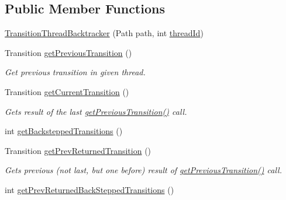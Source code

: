 \subsection*{Public Member Functions}
\begin{DoxyCompactItemize}
\item 
\hyperlink{classgov_1_1nasa_1_1jpf_1_1inspector_1_1server_1_1pathanalysis_1_1_transition_thread_backtracker_a4ebb7b90ea61c6e40ed85ec25c33537e}{Transition\+Thread\+Backtracker} (Path path, int \hyperlink{classgov_1_1nasa_1_1jpf_1_1inspector_1_1server_1_1pathanalysis_1_1_transition_thread_backtracker_ab5825d940eb7057fe8f2493e2c9baa14}{thread\+Id})
\item 
Transition \hyperlink{classgov_1_1nasa_1_1jpf_1_1inspector_1_1server_1_1pathanalysis_1_1_transition_thread_backtracker_ad9effffddf4f1f6fd2687739e7dc1d87}{get\+Previous\+Transition} ()
\begin{DoxyCompactList}\small\item\em Get previous transition in given thread. \end{DoxyCompactList}\item 
Transition \hyperlink{classgov_1_1nasa_1_1jpf_1_1inspector_1_1server_1_1pathanalysis_1_1_transition_thread_backtracker_a414a24c21a4c9e62c5aee10bf284efea}{get\+Current\+Transition} ()
\begin{DoxyCompactList}\small\item\em Gets result of the last \hyperlink{classgov_1_1nasa_1_1jpf_1_1inspector_1_1server_1_1pathanalysis_1_1_transition_thread_backtracker_ad9effffddf4f1f6fd2687739e7dc1d87}{get\+Previous\+Transition()} call. \end{DoxyCompactList}\item 
int \hyperlink{classgov_1_1nasa_1_1jpf_1_1inspector_1_1server_1_1pathanalysis_1_1_transition_thread_backtracker_af524ecf8ea30843d72652a71c8ad11a3}{get\+Backstepped\+Transitions} ()
\item 
Transition \hyperlink{classgov_1_1nasa_1_1jpf_1_1inspector_1_1server_1_1pathanalysis_1_1_transition_thread_backtracker_a68a015f2afa89dc1e5b117c3efa16587}{get\+Prev\+Returned\+Transition} ()
\begin{DoxyCompactList}\small\item\em Gets previous (not last, but one before) result of \hyperlink{classgov_1_1nasa_1_1jpf_1_1inspector_1_1server_1_1pathanalysis_1_1_transition_thread_backtracker_ad9effffddf4f1f6fd2687739e7dc1d87}{get\+Previous\+Transition()} call. \end{DoxyCompactList}\item 
int \hyperlink{classgov_1_1nasa_1_1jpf_1_1inspector_1_1server_1_1pathanalysis_1_1_transition_thread_backtracker_a80b0fb7d97ee1586a5d1b37b8893c1ae}{get\+Prev\+Returned\+Back\+Stepped\+Transitions} ()
\end{DoxyCompactItemize}
